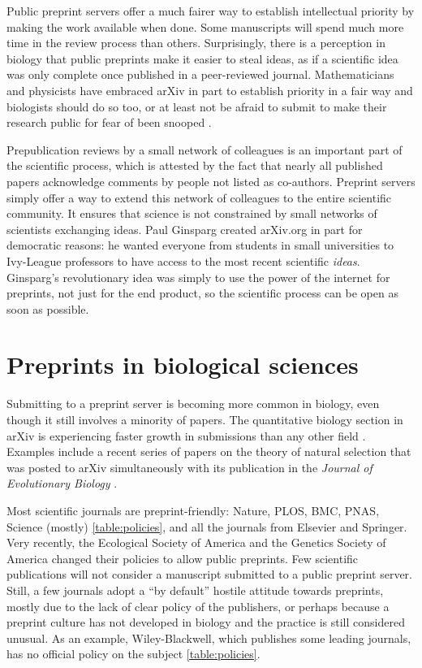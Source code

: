 \documentclass[letterpaper,twocolumn,superscriptaddress,showkeys]{revtex4-1}
\begin{document}
Public preprint servers offer a much fairer way to establish intellectual
priority by making the work available when done. Some manuscripts will spend
much more time in the review process than others. Surprisingly, there is a
perception in biology that public preprints make it easier to steal ideas, as if
a scientific idea was only complete once published in a peer-reviewed journal.
Mathematicians and physicists have embraced arXiv in part to establish priority
in a fair way and biologists should do so too, or at least not be afraid to
submit to make their research public for fear of been snooped \cite{cal12}.

Prepublication reviews by a small network of colleagues is an important part of
the scientific process, which is attested by the fact that nearly all published
papers acknowledge comments by people not listed as co-authors.  Preprint
servers simply offer a way to extend this network of colleagues to the entire
scientific community. It ensures that science is not constrained by small
networks of scientists exchanging ideas.  Paul Ginsparg created arXiv.org in
part for democratic reasons: he wanted everyone from students in small
universities to Ivy-League professors to have access to the most recent
scientific \emph{ideas}.  Ginsparg's revolutionary idea was simply to use the
power of the internet for preprints, not just for the end product, so the
scientific process can be open as soon as possible.

\section{Preprints in biological sciences}

Submitting to a preprint server is becoming more common in biology, even though
it still involves a minority of papers. The quantitative biology section in
arXiv is experiencing faster growth in submissions than any other field
\cite{cal12}. Examples include a recent series of papers on the theory of
natural selection that was posted to arXiv simultaneously with its publication
in the \emph{Journal of Evolutionary Biology}
\cite{JEB:JEB2431,JEB:JEB2498,JEB:JEB2378,JEB:JEB2373}.

Most scientific journals are preprint-friendly: Nature, PLOS, BMC, PNAS, Science
(mostly) \ref{table:policies}, and all the journals from Elsevier and Springer.
Very recently, the Ecological Society of America and the Genetics Society of
America changed their policies to allow public preprints. Few scientific
publications will not consider a manuscript submitted to a public preprint
server.  Still, a few journals adopt a ``by default'' hostile attitude towards
preprints, mostly due to the lack of clear policy of the publishers, or perhaps
because a preprint culture has not developed in biology and the practice is
still considered unusual. As an example, Wiley-Blackwell, which publishes some
leading journals, has no official policy on the subject \ref{table:policies}.
\end{document}
